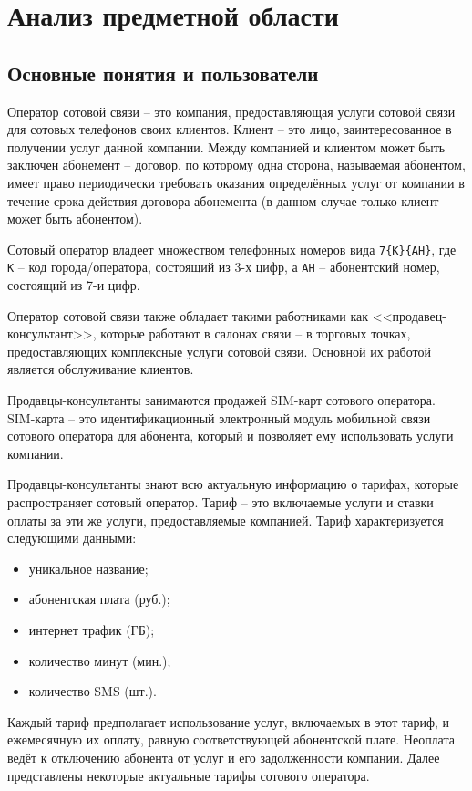 \section{Анализ предметной области}\label{sec:domain-analysis}


\subsection{Основные понятия и пользователи}


Оператор сотовой связи -- это компания, предоставляющая услуги сотовой связи для сотовых телефонов своих клиентов. Клиент -- это лицо, заинтересованное в получении услуг данной компании. Между компанией и клиентом может быть заключен абонемент -- договор, по которому одна сторона, называемая абонентом, имеет право периодически требовать оказания определённых услуг от компании в течение срока действия договора абонемента (в данном случае только клиент может быть абонентом).

Сотовый оператор владеет множеством телефонных номеров вида \texttt{7\{К\}\{АН\}}, где \texttt{К} -- код города/оператора, состоящий из 3-х цифр, а \texttt{АН} -- абонентский номер, состоящий из 7-и цифр.

Оператор сотовой связи также обладает такими работниками как <<продавец-консультант>>, которые работают в салонах связи -- в торговых точках, предоставляющих комплексные услуги сотовой связи. Основной их работой является обслуживание клиентов.

Продавцы-консультанты занимаются продажей SIM-карт сотового оператора. SIM-карта -- это идентификационный электронный модуль мобильной связи сотового оператора для абонента, который и позволяет ему использовать услуги компании.

Продавцы-консультанты знают всю актуальную информацию о тарифах, которые распространяет сотовый оператор. Тариф -- это включаемые услуги и ставки оплаты за эти же услуги, предоставляемые компанией. Тариф характеризуется следующими данными:
\begin{itemize}
    \item уникальное название;
    \item абонентская плата (руб.);
    \item интернет трафик (ГБ);
    \item количество минут (мин.);
    \item количество SMS (шт.).
\end{itemize}

Каждый тариф предполагает использование услуг, включаемых в этот тариф, и ежемесячную их оплату, равную соответствующей абонентской плате. Неоплата ведёт к отключению абонента от услуг и его задолженности компании. Далее представлены некоторые актуальные тарифы сотового оператора.

